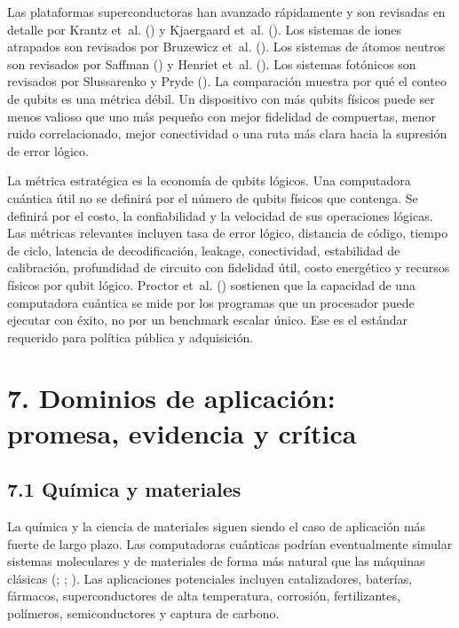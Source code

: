 \documentclass[
  11pt,
  letterpaper,
]{article}
\begin{document}
Las plataformas superconductoras han avanzado rápidamente y son
revisadas en detalle por Krantz et~al. ()
y Kjaergaard et~al. (). Los sistemas
de iones atrapados son revisados por Bruzewicz et~al.
(). Los sistemas de átomos neutros son
revisados por Saffman () y Henriet
et~al. (). Los sistemas fotónicos son
revisados por Slussarenko y Pryde
(). La comparación muestra por qué
el conteo de qubits es una métrica débil. Un dispositivo con más qubits
físicos puede ser menos valioso que uno más pequeño con mejor fidelidad
de compuertas, menor ruido correlacionado, mejor conectividad o una ruta
más clara hacia la supresión de error lógico.

La métrica estratégica es la economía de qubits lógicos. Una computadora
cuántica útil no se definirá por el número de qubits físicos que
contenga. Se definirá por el costo, la confiabilidad y la velocidad de
sus operaciones lógicas. Las métricas relevantes incluyen tasa de error
lógico, distancia de código, tiempo de ciclo, latencia de
decodificación, leakage, conectividad, estabilidad de calibración,
profundidad de circuito con fidelidad útil, costo energético y recursos
físicos por qubit lógico. Proctor et~al.
() sostienen que la capacidad de una
computadora cuántica se mide por los programas que un procesador puede
ejecutar con éxito, no por un benchmark escalar único. Ese es el
estándar requerido para política pública y adquisición.

\section{7. Dominios de aplicación: promesa, evidencia y
crítica}\label{dominios-de-aplicaciuxf3n-promesa-evidencia-y-cruxedtica}

\subsection{7.1 Química y materiales}\label{quuxedmica-y-materiales}

La química y la ciencia de materiales siguen siendo el caso de
aplicación más fuerte de largo plazo. Las computadoras cuánticas podrían
eventualmente simular sistemas moleculares y de materiales de forma más
natural que las máquinas clásicas
(;
; ). Las aplicaciones potenciales incluyen catalizadores,
baterías, fármacos, superconductores de alta temperatura, corrosión,
fertilizantes, polímeros, semiconductores y captura de carbono.
\end{document}
